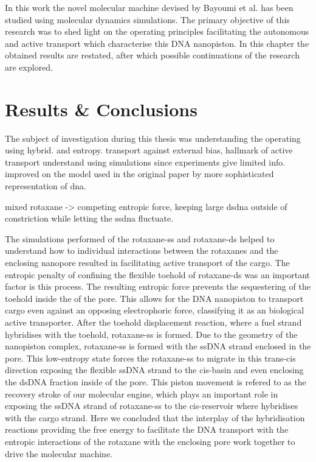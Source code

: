 In this work the novel molecular machine devised by Bayoumi et al. has been studied using
molecular dynamics simulations. The primary objective of this research was to shed
light on the operating principles facilitating the autonomous and active transport which
characterise this DNA nanopiston. In this chapter the obtained results are restated,
after which possible continuations of the research are explored.

\section{Results \& Conclusions}

The subject of investigation during this thesis was understanding the
operating using hybrid. and entropy. transport against external bias, hallmark of active
transport
understand using simulations since experiments give limited info.
improved on the model used in the original paper by more sophisticated representation of
dna.



mixed rotaxane -> competing entropic force, keeping large dsdna outside of constriction
while letting the ssdna fluctuate.



The simulations performed of the rotaxane-ss and rotaxane-ds helped to understand how to
individual interactions between the rotaxanes and the enclosing nanopore resulted in
facilitating active transport of the cargo. The entropic penalty of confining the
flexible toehold of rotaxane-ds was an important factor is this process. The resulting
entropic force prevents the sequestering of the toehold inside the
of the pore. This allows for the DNA nanopiston to transport
cargo even against an opposing electrophoric force, classifying it as an biological
active transporter. After the toehold displacement reaction, where a fuel strand
hybridises with the toehold, rotaxane-ss is formed. Due to the geometry of the nanopiston
complex, rotaxane-ss is formed with the ssDNA strand enclosed in the pore. This
low-entropy state forces the rotaxane-ss to migrate in this trans-cis direction exposing
the flexible ssDNA strand to the cis-basin and even enclosing the dsDNA fraction inside
of the pore. This piston movement is refered to as the recovery stroke of our molecular
engine, which plays an important role in exposing the ssDNA strand of rotaxane-ss to the
cis-reservoir where hybridises with the cargo strand. Here we concluded that the
interplay of the hybridisation reactions providing the free energy to facilitate the DNA
transport with the entropic interactions of the rotaxane with the enclosing pore work
together to drive the molecular machine.


